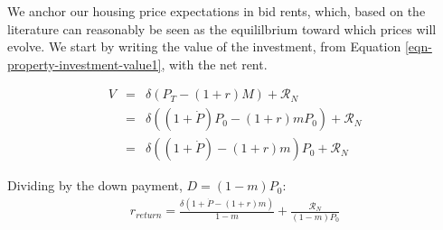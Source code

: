 We anchor our housing price expectations in bid rents, which, based on the literature can reasonably be seen as the equililbrium toward which prices will evolve.  %
We start by writing the value of the investment, from Equation \ref{eqn-property-investment-value1}, with the net rent. %

\begin{eqnarray}
V &=& \delta \left(P_T - (1+r)M\right) +      \mathcal{R}_N   \nonumber \\
  &=& \delta \left((1+\dot P)P_0 - (1+r)m P_0\right)     + \mathcal{R}_N \nonumber \\
  &=& \delta \left((1+\dot P)    - (1+r)m    \right) P_0 + \mathcal{R}_N
\label{eqn-property-investment-value3}
\end{eqnarray}


Dividing by the down payment, $D = (1-m)P_0$:
\begin{eqnarray}
r_{return} = \frac{\delta \left(1 + \dot P - (1+r)m\right)}{1-m} + \frac{\mathcal{R}_N}{(1-m)P_0}
\end{eqnarray}





